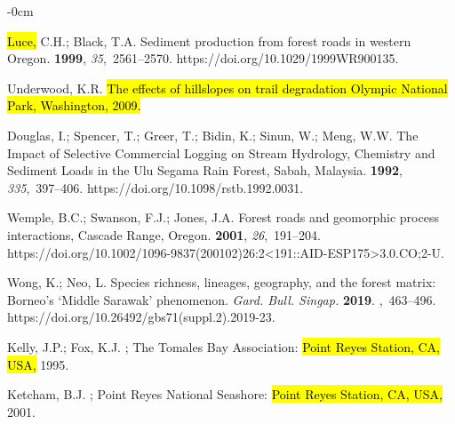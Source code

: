 \documentclass[remotesensing,article,accept,pdftex,moreauthors]{Definitions/mdpi}
\begin{document}
\begin{adjustwidth}{-\extralength}{0cm}
\begin{thebibliography}{999}
\hl{Luce,} %
 C.H.; Black, T.A.
\newblock Sediment production from forest roads in western Oregon.
 {\bf 1999}, {\em 35},~2561--2570. https://doi.org/10.1029/1999WR900135.

Underwood, K.R.
\newblock \hl{The effects of hillslopes on trail degradation Olympic National Park,
  Washington, 2009.} %


Douglas, I.; Spencer, T.; Greer, T.; Bidin, K.; Sinun, W.; Meng, W.W.
\newblock The Impact of Selective Commercial Logging on Stream Hydrology,
  Chemistry and Sediment Loads in the Ulu Segama Rain Forest, Sabah, Malaysia.
 {\bf 1992},
  {\em 335},~397--406. https://doi.org/10.1098/rstb.1992.0031.

Wemple, B.C.; Swanson, F.J.; Jones, J.A.
\newblock Forest roads and geomorphic process interactions, Cascade Range,
  Oregon.
 {\bf 2001}, {\em
  26},~191--204. https://doi.org/10.1002/1096-9837(200102)26:2<191::AID-ESP175>3.0.CO;2-U.

Wong, K.; Neo, L.
\newblock Species richness, lineages, geography, and the forest matrix:
  Borneo's `Middle Sarawak' phenomenon. {\em Gard. Bull. Singap.} {\bf 2019}.
,~463--496.
\newblock https://doi.org/10.26492/gbs71(suppl.2).2019-23.

Kelly, J.P.; Fox, K.J.
; The Tomales Bay Association: \hl{Point Reyes Station, CA, USA,} %
 1995.

Ketcham, B.J.
; Point Reyes National Seashore: \hl{Point Reyes Station, CA, USA,} 2001.


\end{thebibliography}
\end{adjustwidth}
\end{document}
